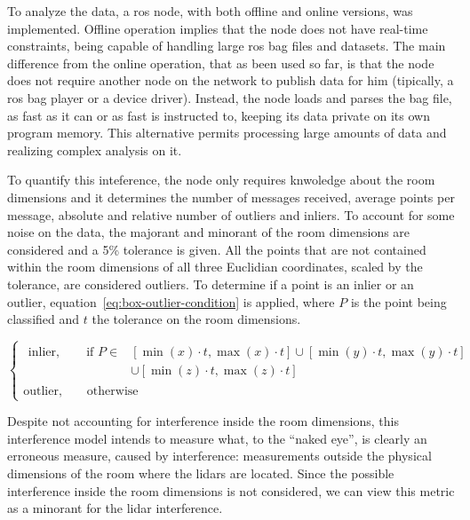 To analyze the data, a \ac{ros} node, with both offline and online versions, was implemented. Offline operation implies that the node does not have real-time constraints, being capable of handling large \ac{ros} bag files and datasets. The main difference from the online operation, that as been used so far, is that the node does not require another node on the network to publish data for him (tipically, a \ac{ros} bag player or a device driver). Instead, the node loads and parses the bag file, as fast as it can or as fast is instructed to, keeping its data private on its own program memory. This alternative permits processing large amounts of data and realizing complex analysis on it.

To quantify this inteference, the node only requires knwoledge about the room dimensions and it  determines the number of messages received, average points per message, absolute and relative number of outliers and inliers. To account for some noise on the data, the majorant and minorant of the room dimensions are considered and a 5\% tolerance is given. All the points that are not contained within the room dimensions of all three Euclidian coordinates, scaled by the tolerance, are considered outliers. To determine if a point is an inlier or an outlier, equation~\ref{eq:box-outlier-condition} is applied, where $P$ is the point being classified and $t$ the tolerance on the room dimensions. 

\begin{equation}
	\label{eq:box-outlier-condition}
	\begin{cases}
		\begin{aligned}
			\text{inlier}, \qquad \text{if } P \in & [\min(x) \cdot t, \max(x) \cdot t] \cup [\min(y) \cdot t, \max(y) \cdot t]  \\
																						&					 \cup [\min(z) \cdot t, \max(z) \cdot t] 
		\end{aligned} \\
		\text{outlier}, \qquad \text{otherwise}
	\end{cases}
\end{equation}

Despite not accounting for interference inside the room dimensions, this interference model intends to measure what, to the ``naked eye'', is clearly an erroneous measure, caused by interference: measurements outside the physical dimensions of the room where the \acp{lidar} are located. Since the possible interference inside the room dimensions is not considered, we can view this metric as a minorant for the \ac{lidar} interference.


